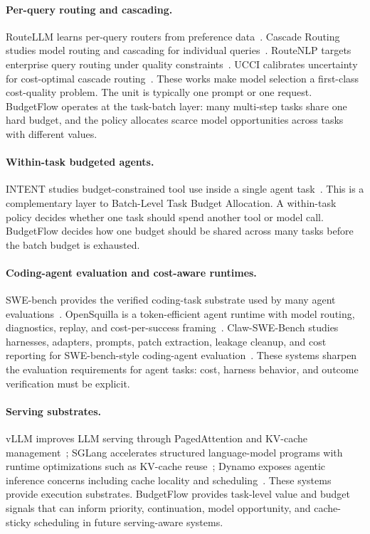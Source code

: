 \documentclass[sigconf,review,anonymous]{acmart}
\begin{document}
\paragraph{Per-query routing and cascading.}
RouteLLM learns per-query routers from preference data~\cite{routellm}. Cascade Routing studies model routing and cascading for individual queries~\cite{cascade-routing}. RouteNLP targets enterprise query routing under quality constraints~\cite{routenlp}. UCCI calibrates uncertainty for cost-optimal cascade routing~\cite{ucci}. These works make model selection a first-class cost-quality problem. The unit is typically one prompt or one request. BudgetFlow operates at the task-batch layer: many multi-step tasks share one hard budget, and the policy allocates scarce model opportunities across tasks with different values.

\paragraph{Within-task budgeted agents.}
INTENT studies budget-constrained tool use inside a single agent task~\cite{intent}. This is a complementary layer to Batch-Level Task Budget Allocation. A within-task policy decides whether one task should spend another tool or model call. BudgetFlow decides how one budget should be shared across many tasks before the batch budget is exhausted.

\paragraph{Coding-agent evaluation and cost-aware runtimes.}
SWE-bench provides the verified coding-task substrate used by many agent evaluations~\cite{swebench}. OpenSquilla is a token-efficient agent runtime with model routing, diagnostics, replay, and cost-per-success framing~\cite{opensquilla}. Claw-SWE-Bench studies harnesses, adapters, prompts, patch extraction, leakage cleanup, and cost reporting for SWE-bench-style coding-agent evaluation~\cite{claw-swe-bench}. These systems sharpen the evaluation requirements for agent tasks: cost, harness behavior, and outcome verification must be explicit.

\paragraph{Serving substrates.}
vLLM improves LLM serving through PagedAttention and KV-cache management~\cite{vllm}; SGLang accelerates structured language-model programs with runtime optimizations such as KV-cache reuse~\cite{sglang}; Dynamo exposes agentic inference concerns including cache locality and scheduling~\cite{dynamo}. These systems provide execution substrates. BudgetFlow provides task-level value and budget signals that can inform priority, continuation, model opportunity, and cache-sticky scheduling in future serving-aware systems.
\end{document}
